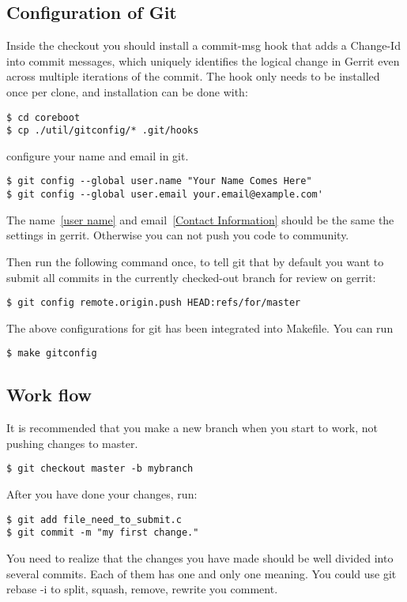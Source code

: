 \documentclass[titlepage,12pt]{article}
\begin{document}
{\subsection{Configuration of Git}
Inside the checkout you should install a commit-msg hook that adds a
Change-Id into commit messages, which uniquely identifies the logical
change in Gerrit even across multiple iterations of the commit. The
hook only needs to be installed once per clone, and installation can
be done with:
{ \small
\begin{verbatim}
$ cd coreboot
$ cp ./util/gitconfig/* .git/hooks
\end{verbatim}
}
configure your name and email in git.
{ \small
\begin{verbatim}
$ git config --global user.name "Your Name Comes Here"
$ git config --global user.email your.email@example.com'
\end{verbatim}
}
The name~\ref{user name} and email~\ref{Contact Information} should be the same the settings in gerrit.
Otherwise you can not push you code to community.

Then run the following command once, to tell git that by default you
want to submit all commits in the currently checked-out branch for
review on gerrit:
{ \small
\begin{verbatim}
$ git config remote.origin.push HEAD:refs/for/master
\end{verbatim}
}

The above configurations for git has been integrated into Makefile. You can run
{ \small
\begin{verbatim}
$ make gitconfig
\end{verbatim}
}

\subsection{Work flow}

It is recommended that you make a new branch when you start to work, not pushing changes to master.
{ \small
\begin{verbatim}
$ git checkout master -b mybranch
\end{verbatim}
}
After you have done your changes, run:
{ \small
\begin{verbatim}
$ git add file_need_to_submit.c
$ git commit -m "my first change."
\end{verbatim}
}

You need to realize that the changes you have made should be well divided into
several commits. Each of them has one and only one meaning. You could use git rebase -i to
split, squash, remove, rewrite you comment.

}
\end{document}
